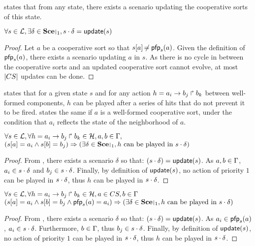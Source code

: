  states that from any state, there exists a scenario updating the cooperative sorts of this state.
\begin{theorem}
\label{th:update}
  $\forall s \in \PHl, \exists \delta \in \restriction{\Sce}{1}, s \PHplay \delta = \update(s)$
\end{theorem}
\begin{proof}
  Let $a$ be a cooperative sort so that ${s[a]} \not\nobreak\mkern -2mu = \mathsf{pfp}_s(a)$.
  Given the definition of $\mathsf{pfp}_s(a)$, there exists a scenario updating $a$ in $s$.
  As there is no cycle in between the cooperative sorts and an updated cooperative sort cannot evolve, at most $|CS|$ updates can be done.
\end{proof}
 states that for a given state $s$ and for any action $h = a_i\rightarrow b_j\Rsh b_k$ between well-formed components, $h$ can be played after a series of hits that do not prevent it to be fired.
 states the same if $a$ is a well-formed cooperative sort, under the condition that $a_i$ reflects the state of the neighborhood of $a$.
\begin{theorem}
\label{th:hcompcomp}
  $\forall s \in \mathcal{L}, \forall h = a_i\rightarrow b_j\Rsh b_k \in \mathcal{H}, a,b \in \Gamma,$\\
  $(\PHget{s}{a} = a_i \wedge \PHget{s}{b} = b_j) \Rightarrow (\exists \delta \in \restriction{\Sce}{1}, \text{$h$ can be played in $s \PHplay \delta$})$
\end{theorem}
\begin{proof}
  From , there exists a scenario $\delta$ so that: $(s \cdot \delta) = \mathsf{update}(s)$.
  As $a,b \in \Gamma$, $a_i \in s \cdot \delta$ and $b_j \in s \cdot \delta$.
  Finally, by definition of $\mathsf{update}(s)$, no action of priority $1$ can be played in $s \cdot \delta$, thus $h$ can be played in $s \cdot \delta$.
\end{proof}
\begin{theorem}
\label{th:hcscomp}
  $\forall s \in \mathcal{L}, \forall h = a_i\rightarrow b_j\Rsh b_k \in \mathcal{H}, a \in CS, b \in \Gamma$\\
  $(\PHget{s}{a} = a_i \wedge \PHget{s}{b} = b_j \wedge \pfp_s(a) = a_i) \Rightarrow (\exists \delta \in \restriction{\Sce}{1}, \text{$h$ can be played in $s \PHplay \delta$})$
\end{theorem}
\begin{proof}
  From , there exists a scenario $\delta$ so that: $(s \cdot \delta) = \mathsf{update}(s)$.
  As $a_i \in \mathsf{pfp}_s(a)$, $a_i \in s \cdot \delta$.
  Furthermore, $b \in \Gamma$, thus $b_j \in s \cdot \delta$.
  Finally, by definition of $\mathsf{update}(s)$, no action of priority $1$ can be played in $s \cdot \delta$, thus $h$ can be played in $s \cdot \delta$.
\end{proof}

